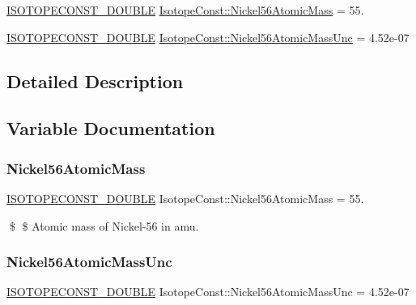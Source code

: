 \begin{DoxyCompactItemize}
\item 
\mbox{\hyperlink{group___isotope_const-_macros_ga8f45a7272ce02c0b4c65c44636ed719a}{I\+S\+O\+T\+O\+P\+E\+C\+O\+N\+S\+T\+\_\+\+D\+O\+U\+B\+LE}} \mbox{\hyperlink{group___isotope_const-_nickel-_ni56_ga79095f070417327f412b571202fddeb0}{Isotope\+Const\+::\+Nickel56\+Atomic\+Mass}} = 55.
\item 
\mbox{\hyperlink{group___isotope_const-_macros_ga8f45a7272ce02c0b4c65c44636ed719a}{I\+S\+O\+T\+O\+P\+E\+C\+O\+N\+S\+T\+\_\+\+D\+O\+U\+B\+LE}} \mbox{\hyperlink{group___isotope_const-_nickel-_ni56_ga66c3d35fe1291b8a4b02157a5b1cde62}{Isotope\+Const\+::\+Nickel56\+Atomic\+Mass\+Unc}} = 4.\+52e-\/07
\end{DoxyCompactItemize}


\subsection{Detailed Description}


\subsection{Variable Documentation}
\mbox{\label{group___isotope_const-_nickel-_ni56_ga79095f070417327f412b571202fddeb0}} 
\subsubsection{\texorpdfstring{Nickel56\+Atomic\+Mass}{Nickel56AtomicMass}}
{\footnotesize\ttfamily \mbox{\hyperlink{group___isotope_const-_macros_ga8f45a7272ce02c0b4c65c44636ed719a}{I\+S\+O\+T\+O\+P\+E\+C\+O\+N\+S\+T\+\_\+\+D\+O\+U\+B\+LE}} Isotope\+Const\+::\+Nickel56\+Atomic\+Mass = 55.}

\$ \$ Atomic mass of Nickel-\/56 in amu. \mbox{\label{group___isotope_const-_nickel-_ni56_ga66c3d35fe1291b8a4b02157a5b1cde62}} 
\subsubsection{\texorpdfstring{Nickel56\+Atomic\+Mass\+Unc}{Nickel56AtomicMassUnc}}
{\footnotesize\ttfamily \mbox{\hyperlink{group___isotope_const-_macros_ga8f45a7272ce02c0b4c65c44636ed719a}{I\+S\+O\+T\+O\+P\+E\+C\+O\+N\+S\+T\+\_\+\+D\+O\+U\+B\+LE}} Isotope\+Const\+::\+Nickel56\+Atomic\+Mass\+Unc = 4.\+52e-\/07}

